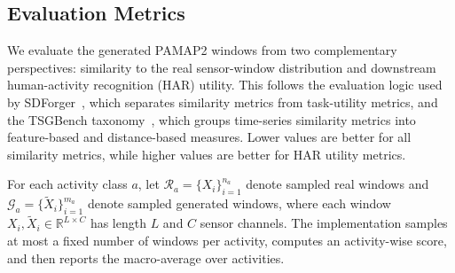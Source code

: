 \subsection{Evaluation Metrics}
\label{sec:evaluation_metrics}

We evaluate the generated PAMAP2 windows from two complementary perspectives:
similarity to the real sensor-window distribution and downstream human-activity
recognition (HAR) utility. This follows the evaluation logic used by
SDForger~\cite{rousseau2025sdforger}, which separates similarity metrics from
task-utility metrics, and the TSGBench taxonomy~\cite{ang2023tsgbench}, which
groups time-series similarity metrics into feature-based and distance-based
measures. Lower values are better for all similarity metrics, while higher
values are better for HAR utility metrics.

For each activity class $a$, let
$\mathcal{R}_a=\{X_i\}_{i=1}^{n_a}$ denote sampled real windows and
$\mathcal{G}_a=\{\tilde{X}_i\}_{i=1}^{m_a}$ denote sampled generated windows,
where each window $X_i,\tilde{X}_i\in\mathbb{R}^{L\times C}$ has length $L$ and
$C$ sensor channels. The implementation samples at most a fixed number of
windows per activity, computes an activity-wise score, and then reports the
macro-average over activities.

